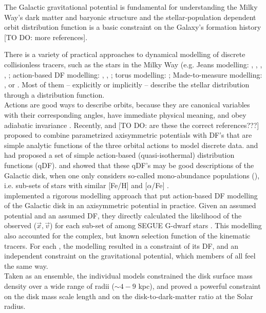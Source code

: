 The Galactic gravitational potential is fundamental for understanding the Milky Way's dark matter and baryonic structure \citep{rix13,2012EPJWC..1910002M,2013PhR...531....1S,2014JPhG...41f3101R} and the stellar-population dependent orbit distribution function is a basic constraint on the Galaxy's formation history \citep{2013NewAR..57...29B,rix13,san15} [TO DO: more references].

There is a variety of practical approaches to dynamical modelling of discrete collisionless tracers, such as the stars in the Milky Way (e.g. Jeans modelling: \citet{1989MNRAS.239..605K}, \citet{2012ApJ...756...89B}, \citet{2012MNRAS.425.1445G}, \citet{2013ApJ...772..108Z}, \citet{bue15}; action-based DF modelling: \citet{bov13}, \citet{pif14}, \citet{san15}; torus modelling:  \citet{2012MNRAS.419.2251M,2013MNRAS.433.1411M}; Made-to-measure modelling: \citet{sye96}, \citet{lor07} or \citet{hun14}. Most of them -- explicitly or implicitly -- describe the stellar distribution through a distribution function. \\

Actions are good ways to describe orbits, because they are canonical variables with their corresponding angles, have immediate physical meaning, and obey adiabatic invariance \citep{bin08,2008MNRAS.390..429M,bin10,bin11,bin11b}. Recently, \citet{2012MNRAS.426.1328B} and \citet{bov13} [TO DO: are these the correct references???] proposed to combine parametrized axisymmetric potentials with DF's that are simple analytic functions of the three orbital actions to model discrete data. \citet{bin10} and \citet{bin11} had proposed a set of simple action-based (quasi-isothermal) distribution functions (qDF). \citet{tin13} and \citet{bov13} showed that these qDF's may be good descriptions of the Galactic disk, when one only considers so-called mono-abundance populations (\MAP{}), i.e. sub-sets of stars with similar [Fe/H] and [$\alpha$/Fe] \citep{bov12b,bov12c,bov12d}. \\

\citet{bov13} implemented a rigorous modelling approach that put action-based DF modelling of the Galactic disk in an axisymmetric potential in practice. Given an assumed potential and an assumed DF, they directly calculated the likelihood of the observed ($\vec{x},\vec{v}$) for each sub-set of \MAP{} among SEGUE G-dwarf stars \citep{yan09}. This modelling also accounted for the complex, but known selection function of the kinematic tracers.  For each \MAP{}, the modelling resulted in a constraint of its DF, and an independent constraint on the gravitational potential, which members of all \MAPs{} feel the same way. \\
Taken as an ensemble, the individual \MAP{} models constrained the disk surface mass density over a wide range of radii ($\sim 4-9$ kpc), and proved a powerful constraint on the disk mass scale length and on the disk-to-dark-matter ratio at the Solar radius. \\

